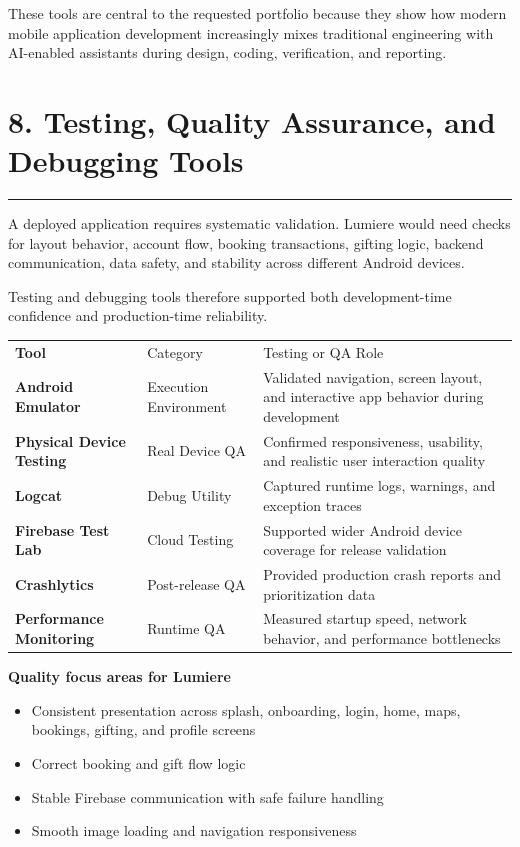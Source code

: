 \documentclass[11pt,a4paper]{article}
\newcommand{\PageTitle}[1]{\section*{#1}\vspace{2pt}\textcolor{LumiereGold}{\rule{\textwidth}{1.1pt}}\vspace{6pt}}
\newcommand{\SmallSpace}{\vspace{4pt}}
\begin{document}
\SmallSpace
These tools are central to the requested portfolio because they show how modern mobile application development increasingly mixes traditional engineering with AI-enabled assistants during design, coding, verification, and reporting.

\newpage
\PageTitle{8. Testing, Quality Assurance, and Debugging Tools}

A deployed application requires systematic validation. Lumiere would need checks for layout behavior, account flow, booking transactions, gifting logic, backend communication, data safety, and stability across different Android devices.

Testing and debugging tools therefore supported both development-time confidence and production-time reliability.

\begin{tabularx}{\textwidth}{>{\bfseries}p{2.7cm} p{2.3cm} Y}
\color{white}Tool & \color{white}Category & \color{white}Testing or QA Role \\
Android Emulator & Execution Environment & Validated navigation, screen layout, and interactive app behavior during development \\
Physical Device Testing & Real Device QA & Confirmed responsiveness, usability, and realistic user interaction quality \\
Logcat & Debug Utility & Captured runtime logs, warnings, and exception traces \\
Firebase Test Lab & Cloud Testing & Supported wider Android device coverage for release validation \\
Crashlytics & Post-release QA & Provided production crash reports and prioritization data \\
Performance Monitoring & Runtime QA & Measured startup speed, network behavior, and performance bottlenecks \\
\end{tabularx}

\SmallSpace
\begin{tcolorbox}[colback=LumiereCream,colframe=LumiereLine,boxrule=0.6pt,arc=2mm]
\textbf{\textcolor{LumiereDark}{Quality focus areas for Lumiere}}
\begin{itemize}
\item Consistent presentation across splash, onboarding, login, home, maps, bookings, gifting, and profile screens
\item Correct booking and gift flow logic
\item Stable Firebase communication with safe failure handling
\item Smooth image loading and navigation responsiveness
\end{itemize}
\end{tcolorbox}
\end{document}
